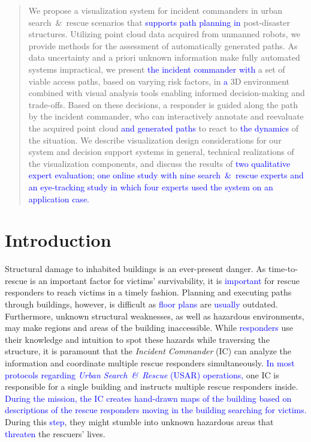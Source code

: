 \documentclass{egpubl}
\newcommand{\diff}[1]{\textcolor{blue}{#1}}
\begin{document}
\begin{abstract}
We propose a visualization system for incident commanders in urban search~\&~rescue scenarios that \diff{supports path planning} \diff{in} post-disaster structures. Utilizing point cloud data acquired from unmanned robots, we provide methods for the assessment of automatically generated paths. As data uncertainty and a priori unknown information make fully automated systems impractical, we present \diff{the incident commander with} a set of viable access paths, based on varying risk factors, in \diff{a} 3D environment combined with visual analysis tools enabling informed decision-making and trade-offs. Based on these decisions, a responder is guided along the path by the incident commander, who can interactively annotate and reevaluate the acquired point cloud \diff{and generated paths} to react to \diff{the dynamics} of the situation. We describe visualization design considerations for our system and decision support systems in general, technical realizations of the visualization components, and discuss the results of \diff{two qualitative expert evaluation; one online study with nine search~\&~rescue experts and an eye-tracking study in which four experts used the system on an application case.}

\begin{classification}
\end{classification}

\end{abstract}

\section{Introduction}
Structural damage to inhabited buildings is an ever-present danger. As time-to-rescue is an important factor for victims' survivability, it is \diff{important} for rescue responders to reach victims in a timely fashion. Planning and executing paths through buildings, however, is difficult as \diff{floor plans} are \diff{usually} outdated. Furthermore, unknown structural weaknesses, as well as hazardous environments, may make regions and areas of the building inaccessible. While \diff{responders} use their knowledge and intuition to spot these hazards while traversing the structure, it is paramount that the \emph{Incident Commander} (IC) can analyze the information and coordinate multiple rescue responders simultaneously. \diff{In most protocols regarding \emph{Urban Search~\&~Rescue} (USAR) operations,} one IC is responsible for a single building and instructs multiple rescue responders inside. \diff{During the mission, the IC creates hand-drawn maps of the building based on descriptions of the rescue responders moving in the building searching for victims.} During this \diff{step}, they might stumble into unknown hazardous areas that \diff{threaten} the rescuers' lives.
\end{document}

